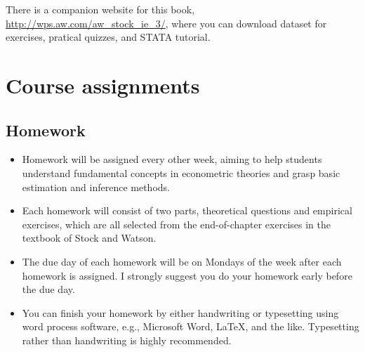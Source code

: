 \documentclass[a4paper,11pt]{article}
\begin{document}
There is a companion website for this book,
\url{http://wps.aw.com/aw\_stock\_ie\_3/}, where you can download dataset for
exercises, pratical quizzes, and STATA tutorial. 

\section{Course assignments}
\label{sec:orgd3958ce}
\subsection*{Homework}
\label{sec:org22e4ae0}

\begin{itemize}
\item Homework will be assigned every other week, aiming to help students
understand fundamental concepts in econometric theories and grasp
basic estimation and inference methods.

\item Each homework will consist of two parts, theoretical questions and
empirical exercises, which are all selected from the end-of-chapter
exercises in the textbook of Stock and Watson.

\item The due day of each homework will be on Mondays of the week after
each homework is assigned. I strongly suggest you do your homework
early before the due day.

\item You can finish your homework by either handwriting or typesetting
using word process software, e.g., Microsoft Word, \LaTeX{}, and the
like. Typesetting rather than handwriting is highly recommended.


\end{itemize}
\end{document}
